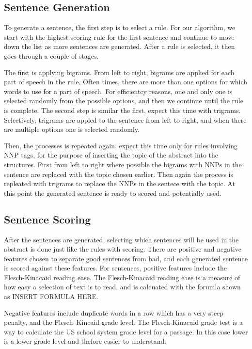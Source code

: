 \documentclass[letterpaper, 10 pt, conference]{ieeeconf}  %
\begin{document}
\subsection{Sentence Generation}

To generate a sentence, the first step is to select a rule. For our algorithm, we start with the highest scoring rule for the first sentence and continue to move down the list as more sentences are generated. After a rule is selected, it then goes through a couple of stages.

The first is applying bigrams. From left to right, bigrams are applied for each part of speech in the rule. Often times, there are more than one options for which words to use for a part of speech. For efficientcy reasons, one and only one is selected randomly from the possible options, and then we continue until the rule is complete. The second step is similar the first, expect this time with trigrams. Selectively, trigrams are appled to the sentence from left to right, and when there are multiple options one is selected randomly.

Then, the processes is repeated again, expect this time only for rules involving NNP tags, for the purpose of inserting the topic of the abstract into the structures. First from left to right where possible the bigrams with NNPs in the sentence are replaced with the topic chosen earlier. Then again the process is repleated with trigrams to replace the NNPs in the sentece with the topic. At this point the generated sentence is ready to scored and potentially used.

\subsection{Sentence Scoring}

After the sentences are generated, selecting which sentences will be used in the abstract is done just like the rules with scoring. There are positive and negative features chosen to separate good sentences from bad, and each generated sentence is scored against these features. For sentences, positive features include the Flesch-Kinacaid reading ease. The Flesch-Kinacaid reading ease is a measure of how easy a selection of text is to read, and is calcuated with the forumla shown as INSERT FORMULA HERE.

Negative features include duplicate words in a row which has a very steep penalty, and the Flesch–Kincaid grade level. The Flesch-Kinacaid grade test is a way to calculate the US school system grade level for a passage. In this case lower is a lower grade level and thefore easier to understand.
\end{document}
